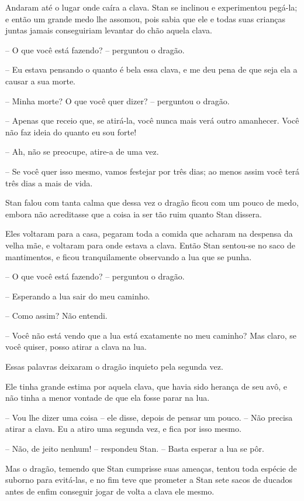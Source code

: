 Andaram até o lugar onde caíra a clava. Stan se inclinou e
experimentou pegá-la; e então um grande medo lhe assomou, pois sabia
que ele e todas suas crianças juntas jamais conseguiriam levantar do
chão aquela clava. 

-- O que você está fazendo? -- perguntou o dragão.

-- Eu estava pensando o quanto é bela essa clava, e me deu pena de que
seja ela a causar a sua morte.

-- Minha morte? O que você quer dizer? -- perguntou o dragão.

-- Apenas que receio que, se atirá-la, você nunca mais verá outro
amanhecer. Você não faz ideia do quanto eu sou forte!

-- Ah, não se preocupe, atire-a de uma vez.

-- Se você quer isso mesmo, vamos festejar por três dias; ao menos
assim você terá três dias a mais de vida.

Stan falou com tanta calma que dessa vez o dragão ficou com um pouco
de medo, embora não acreditasse que a coisa ia ser tão ruim quanto
Stan dissera.

Eles voltaram para a casa, pegaram toda a comida que acharam na
despensa da velha mãe, e voltaram para onde estava a clava. Então
Stan sentou-se no saco de mantimentos, e ficou tranquilamente
observando a lua que se punha.

-- O que você está fazendo? -- perguntou o dragão.

-- Esperando a lua sair do meu caminho.

-- Como assim? Não entendi.

-- Você não está vendo que a lua está exatamente no meu caminho? Mas
claro, se você quiser, posso atirar a clava na lua.

Essas palavras deixaram o dragão inquieto pela segunda vez.

Ele tinha grande estima por aquela clava, que havia sido herança de
seu avô, e não tinha a menor vontade de que ela fosse parar na lua.

-- Vou lhe dizer uma coisa -- ele disse, depois de pensar um pouco. --
Não precisa atirar a clava. Eu a atiro uma segunda vez, e fica por
isso mesmo.

-- Não, de jeito nenhum! -- respondeu Stan. -- Basta esperar a lua se
pôr.

Mas o dragão, temendo que Stan cumprisse suas ameaças, tentou toda
espécie de suborno para evitá-las, e no fim teve que prometer a Stan
sete sacos de ducados antes de enfim conseguir jogar de volta a clava
ele mesmo.

